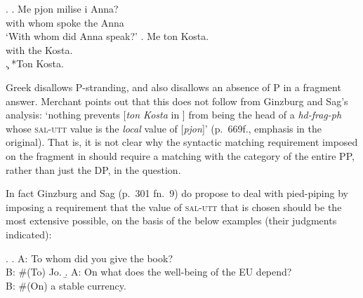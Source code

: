 \documentclass[doublespace]{umthesis}
\begin{document}
\ex.	\ag. Me pjon milise i Anna?\\
	    with whom spoke the Anna\\
	    `With whom did Anna speak?'
	 \bg. Me ton Kosta.\\
	 	with the Kosta.\\
	 \c. *Ton Kosta.
	 
Greek disallows P-stranding, and also disallows an absence of P in a fragment answer. Merchant points out that this does not follow from Ginzburg and Sag's analysis: `nothing prevents [{\it ton Kosta} in \Last] from being the head of a {\it hd-frag-ph} whose \textsc{sal-utt} value is the \emph{local} value of [{\it pjon}]' (p.~669f., emphasis in the original). That is, it is not clear why the syntactic matching requirement imposed on the fragment in \Last[b] should require a matching with the category of the entire PP, rather than just the DP, in the question.

In fact Ginzburg and Sag (p.~301 fn.~9) do propose to deal with pied-piping by imposing a requirement that the value of \textsc{sal-utt} that is chosen should be the most extensive possible, on the basis of the below examples (their judgments indicated):

\ex. 	\a. A: To whom did you give the book?\\
		B: \#(To) Jo.
	\b. A: On what does the well-being of the EU depend?\\
		B: \#(On) a stable currency.
\end{document}
